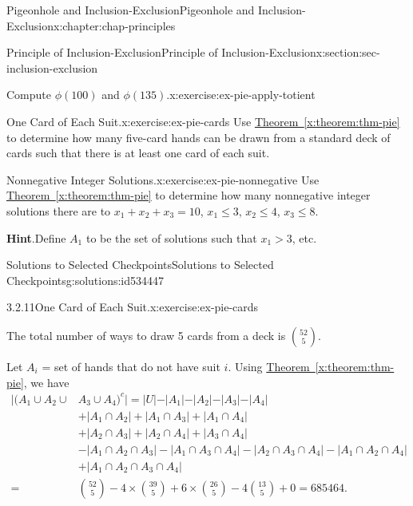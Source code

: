 \documentclass[oneside,10pt,]{book}
\newcommand{\blocktitlefont}{\relax}
\newcommand{\xreffont}{\relax}
\numberwithin{equation}{section}
\newcommand{\gt}{>}
\newcommand{\amp}{&}
\begin{document}
\begin{chapterptx}{Pigeonhole and Inclusion-Exclusion}{}{Pigeonhole and Inclusion-Exclusion}{}{}{x:chapter:chap-principles}
\begin{sectionptx}{Principle of Inclusion-Exclusion}{}{Principle of Inclusion-Exclusion}{}{}{x:section:sec-inclusion-exclusion}
\begin{inlineexercise}{Compute \(\phi(100)\) and \(\phi(135)\).}{x:exercise:ex-pie-apply-totient}
\end{inlineexercise}%
\begin{inlineexercise}{One Card of Each Suit.}{x:exercise:ex-pie-cards}%
Use \hyperref[x:theorem:thm-pie]{Theorem~{\xreffont\ref{x:theorem:thm-pie}}} to determine how many five-card hands can be drawn from a standard deck of cards such that there is at least one card of each suit.%
\end{inlineexercise}%
\begin{inlineexercise}{Nonnegative Integer Solutions.}{x:exercise:ex-pie-nonnegative}%
Use \hyperref[x:theorem:thm-pie]{Theorem~{\xreffont\ref{x:theorem:thm-pie}}} to determine how many nonnegative integer solutions there are to \(x_1 + x_2 + x_3 = 10\), \(x_1 \leq 3\), \(x_2 \leq 4\), \(x_3 \leq 8\).%
\par\smallskip%
\noindent\textbf{\blocktitlefont Hint}.\hypertarget{g:hint:id534379}{}\quad{}Define \(A_1\) to be the set of solutions such that \(x_1 \gt 3\), etc.%
\end{inlineexercise}%
%
%
\typeout{************************************************}
\typeout{************************************************}
%
\begin{solutions-subsection-numberless}{Solutions to Selected Checkpoints}{}{Solutions to Selected Checkpoints}{}{}{g:solutions:id534447}
\begin{inlinesolution}{3.2.11}{One Card of Each Suit.}{x:exercise:ex-pie-cards}%
\par\smallskip%
\noindent\hypertarget{g:solution:id534339-main}{}The total number of ways to draw 5 cards from a deck is \(\displaystyle\binom{52}{5}\).%
\par
Let \(A_i\) = set of hands that do not have suit \(i\). Using \hyperref[x:theorem:thm-pie]{Theorem~{\xreffont\ref{x:theorem:thm-pie}}}, we have%
\begin{align*}
|(A_1 \cup A_2 \cup \amp A_3 \cup A_4)^{c}| = |U| - |A_1| - |A_2| - |A_3| - |A_4| \\
\amp + |A_1 \cap A_2| + |A_1 \cap A_3| + |A_1 \cap A_4|\\
\amp + |A_2 \cap A_3| + |A_2 \cap A_4| + |A_3 \cap A_4|\\
\amp - |A_1 \cap A_2 \cap A_3| - |A_1 \cap A_3 \cap A_4| - |A_2 \cap A_3 \cap A_4| - |A_1 \cap A_2 \cap A_4|\\
\amp + |A_1 \cap A_2 \cap A_3 \cap A_4|\\
= \amp {{52}\choose{5}} - 4 \times {{39}\choose{5}} + 6 \times {{26}\choose{5}} - 4 {{13}\choose{5}} + 0 = 685464\text{.}

\end{align*}
\end{inlinesolution}
\end{solutions-subsection-numberless}
\end{sectionptx}
\end{chapterptx}
\end{document}
